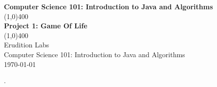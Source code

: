 \documentclass[11]{article}
\begin{document}
\begin{titlepage}
\begin{center}
\vspace{1cm}
\Large{\textbf{Computer Science 101: Introduction to Java and Algorithms}}\\
\vfill
\line(1,0){400}\\
\huge{\textbf{Project 1: Game Of Life}}\\
\line(1,0){400}\\
\vfill
Erudition Labs\\
Computer Science 101: Introduction to Java and Algorithms\\
\today\\
\end{center}
\end{titlepage}

\tableofcontents
\thispagestyle{empty}
\clearpage
\setcounter{page}{1}

.
\end{document}

